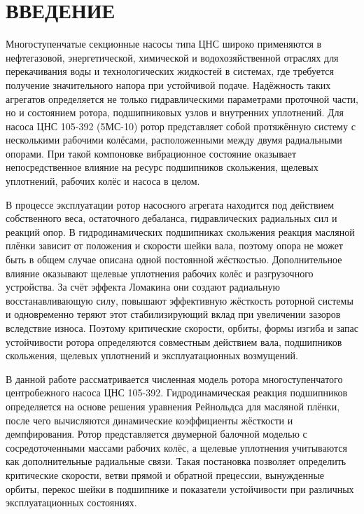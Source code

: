 \newpage
{}
{}
\section*{ВВЕДЕНИЕ}

Многоступенчатые секционные насосы типа ЦНС широко применяются в нефтегазовой, энергетической, химической и водохозяйственной отраслях для перекачивания воды и технологических жидкостей в системах, где требуется получение значительного напора при устойчивой подаче. Надёжность таких агрегатов определяется не только гидравлическими параметрами проточной части, но и состоянием ротора, подшипниковых узлов и внутренних уплотнений. Для насоса ЦНС 105-392 (5МС-10) ротор представляет собой протяжённую систему с несколькими рабочими колёсами, расположенными между двумя радиальными опорами. При такой компоновке вибрационное состояние оказывает непосредственное влияние на ресурс подшипников скольжения, щелевых уплотнений, рабочих колёс и насоса в целом.

В процессе эксплуатации ротор насосного агрегата находится под действием собственного веса, остаточного дебаланса, гидравлических радиальных сил и реакций опор. В гидродинамических подшипниках скольжения реакция масляной плёнки зависит от положения и скорости шейки вала, поэтому опора не может быть в общем случае описана одной постоянной жёсткостью. Дополнительное влияние оказывают щелевые уплотнения рабочих колёс и разгрузочного устройства. За счёт эффекта Ломакина они создают радиальную восстанавливающую силу, повышают эффективную жёсткость роторной системы и одновременно теряют этот стабилизирующий вклад при увеличении зазоров вследствие износа. Поэтому критические скорости, орбиты, формы изгиба и запас устойчивости ротора определяются совместным действием вала, подшипников скольжения, щелевых уплотнений и эксплуатационных возмущений.

В данной работе рассматривается численная модель ротора многоступенчатого центробежного насоса ЦНС 105-392. Гидродинамическая реакция подшипников определяется на основе решения уравнения Рейнольдса для масляной плёнки, после чего вычисляются динамические коэффициенты жёсткости и демпфирования. Ротор представляется двумерной балочной моделью с сосредоточенными массами рабочих колёс, а щелевые уплотнения учитываются как дополнительные радиальные связи. Такая постановка позволяет определить критические скорости, ветви прямой и обратной прецессии, вынужденные орбиты, перекос шейки в подшипнике и показатели устойчивости при различных эксплуатационных состояниях.

